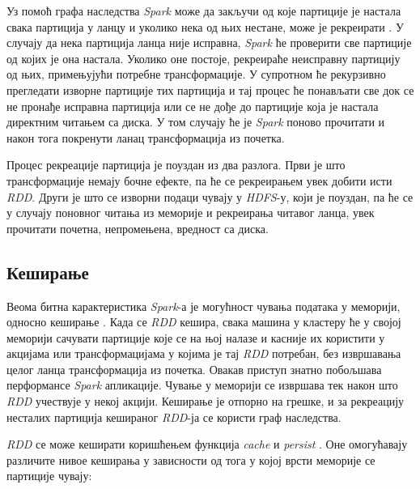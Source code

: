 \documentclass[12pt,oneside]{memoir}
\begin{document}
Уз помоћ графа наследства \textit{Spark} може да закључи од које партиције је настала свака партиција у ланцу и уколико нека од њих нестане, може је рекреирати \cite{hadoop_learning}. У случају да нека партиција ланца није исправна, \textit{Spark} ће проверити све партиције од којих је она настала. Уколико оне постоје, рекреираће неисправну партицију од њих, примењујући потребне трансформације. У супротном ће рекурзивно прегледати изворне партиције тих партиција и тај процес ће понављати све док се не пронађе исправна партиција или се не дође до партиције која је настала директним читањем са диска. У том случају ће је \textit{Spark} поново прочитати и након тога покренути ланац трансформација из почетка.

Процес рекреације партиција је поуздан из два разлога. Први је што трансформације немају бочне ефекте, па ће се рекреирањем увек добити исти \textit{RDD}. Други је што се изворни подаци чувају у \textit{HDFS}-у, који је поуздан, па ће се у случају поновног читања из меморије и рекреирања читавог ланца, увек прочитати почетна, непромењена, вредност са диска.

\subsection{Кеширање}
\label{subsec:spark_persist}

Веома битна карактеристика \textit{Spark}-а је могућност чувања података у меморији, односно кеширање \cite{spark_rdd}. Када се \textit{RDD} кешира, свака машина у кластеру ће у својој меморији сачувати партиције које се на њој налазе и касније их користити у акцијама или трансформацијама у којима је тај \textit{RDD} потребан, без извршавања целог ланца трансформација из почетка. Овакав приступ знатно побољшава перформансе \textit{Spark} апликације. Чување у меморији се извршава тек након што \textit{RDD} учествује у некој акцији. Кеширање је отпорно на грешке, и за рекреацију несталих партиција кешираног \textit{RDD}-ја се користи граф наследства.

\textit{RDD} се може кеширати коришћењем функција \textit{cache} и \textit{persist} \cite{spark_rdd}. Оне омогућавају различите нивое кеширања у зависности од тога у којој врсти меморије се партиције чувају:
\end{document}
